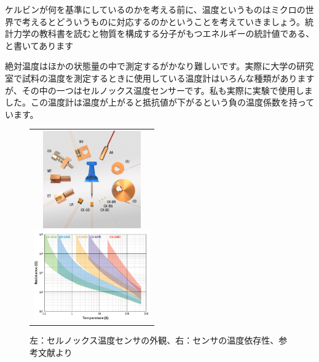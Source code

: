 \documentclass[10pt,b5paper,papersize,dvipdfmx]{jsbook}
\begin{document}
ケルビンが何を基準にしているのかを考える前に、温度というものはミクロの世界で考えるとどういうものに対応するのかということを考えていきましょう。統計力学の教科書を読むと物質を構成する分子がもつエネルギーの統計値である、と書いてあります\par
絶対温度はほかの状態量の中で測定するがかなり難しいです。実際に大学の研究室で試料の温度を測定するときに使用している温度計はいろんな種類がありますが、その中の一つはセルノックス温度センサーです。私も実際に実験で使用しました。この温度計は温度が上がると抵抗値が下がるという負の温度係数を持っています。
\begin{figure}[htbp]
  \begin{center}
      \begin{tabular}{c}
      \begin{minipage}{0.5\hsize}
          \begin{center}
          \includegraphics[clip, width=4.2cm]{img/cryotronics.png}
          \end{center}
      \end{minipage}
      \begin{minipage}{0.5\hsize}
          \begin{center}
          \includegraphics[clip, width=5cm]{img/CX-chart-1.png}
          \end{center}
      \end{minipage}
  
      \end{tabular}
      \caption{左：セルノックス温度センサの外観、右：センサの温度依存性、参考文献\cite{ondo}より}
      \label{fig:cryotronics}
  \end{center}
\end{figure}
\end{document}
